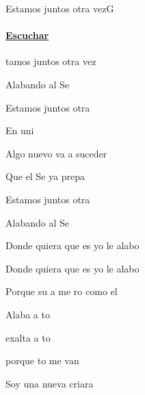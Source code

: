 \documentclass[12pt, spanish]{book}
\begin{document}
    \begin{song}{Estamos juntos otra vez}{G}
    {} %
    {}
    {} %
    {}
        \ifChordBk
            \paragraph{\mbox{}\hfill\protect\href{https://open.spotify.com/intl-es/track/4Iq6Cfo58kwQng5RV2Z5qd}{Escuchar}\mbox{}\hfill}
        \fi



        \begin{SBOpGroup}
            tamos juntos otra vez

            Alabando al Se

            Estamos juntos otra 

            En uni
        \end{SBOpGroup}
        \vskip 20pt
        \begin{SBOpGroup}
            Algo nuevo va a suceder

            Que el Se ya prepa

            Estamos juntos otra 

            Alabando al Se
        \end{SBOpGroup}

        \begin{SBChorus}
            Donde quiera que es yo le alabo

            Donde quiera que es yo le alabo

            Porque su a me ro como el 
        \end{SBChorus}

        \begin{SBOpGroup}
            Alaba a to

            exalta a to

            porque to me van
        \end{SBOpGroup}
        \vskip 20pt
        \begin{SBOpGroup}
            Soy una nueva criara


\end{SBOpGroup}
\end{song}
\end{document}
